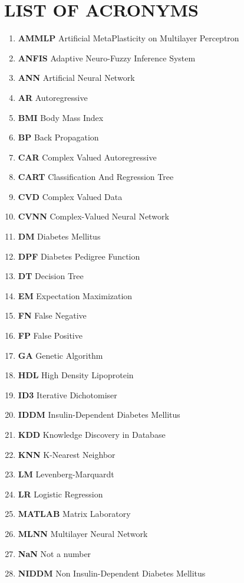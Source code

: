 \documentclass[a4paper, 14pt, oneside]{Thesis}
\begin{document}
\chapter*{LIST OF ACRONYMS}  
\begin{enumerate}
 \item {\bf AMMLP }  { Artiﬁcial MetaPlasticity on Multilayer Perceptron}
\item {\bf ANFIS }  {  Adaptive Neuro-Fuzzy Inference System }
\item {\bf ANN }{ Artiﬁcial Neural Network}
\item {\bf AR }{ Autoregressive}
\item {\bf BMI }  { Body Mass Index}
\item {\bf BP }  { Back Propagation}
\item {\bf CAR }  { Complex Valued Autoregressive}
\item {\bf CART }  { Classification And Regression Tree}
\item {\bf CVD }  { Complex Valued Data}
\item {\bf CVNN }  { Complex-Valued Neural Network}
\item {\bf DM} { Diabetes Mellitus}  
\item {\bf DPF}{ Diabetes Pedigree Function}  
\item {\bf DT}{ Decision Tree }  
\item {\bf EM}{ Expectation Maximization}
\item {\bf FN}{ False Negative}  
\item {\bf FP}{ False Positive}
\item {\bf GA}{ Genetic Algorithm}
\item {\bf HDL}{ High Density Lipoprotein}
\item {\bf ID3}{ Iterative Dichotomiser }
\item {\bf IDDM }{ Insulin-Dependent Diabetes Mellitus}
\item {\bf KDD}{ Knowledge Discovery in Database }
\item {\bf KNN}{ K-Nearest Neighbor}
\item {\bf LM}{ Levenberg-Marquardt}  
\item {\bf LR}{ Logistic Regression}  
\item {\bf MATLAB}{ Matrix Laboratory}
\item {\bf MLNN}{ Multilayer Neural Network }
\item {\bf NaN}{ Not a number }  
\item {\bf NIDDM }{ Non Insulin-Dependent Diabetes Mellitus}  

\end{enumerate}
\end{document}
